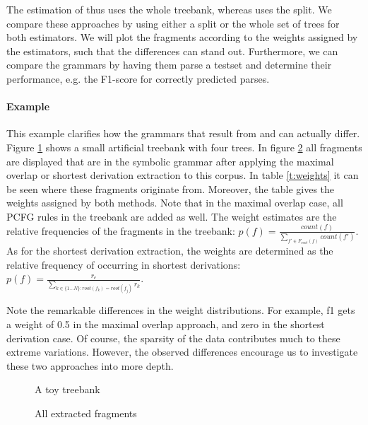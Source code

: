 The estimation of \ddop{} thus uses the whole treebank, whereas \dops{} uses the split. We compare these approaches by using either a split or the whole set of trees for both estimators. We will plot the fragments according to the weights assigned by the estimators, such that the differences can stand out.
Furthermore, we can compare the grammars by having them parse a testset and determine their performance, e.g. the F1-score for correctly predicted parses.


\paragraph{Example}
\FloatBarrier
This example clarifies how the grammars that result from \ddop{} and \dops{} can actually differ. Figure \ref{f:treebank} shows a small artificial treebank with four trees. In figure \ref{f:fragments} all fragments are displayed that are in the symbolic grammar after applying the maximal overlap or shortest derivation extraction to this corpus. In table \ref{t:weights} it can be seen where these fragments originate from. Moreover, the table gives the weights assigned by both methods. Note that in the maximal overlap case, all PCFG rules in the treebank are added as well. The weight estimates are the relative frequencies of the fragments in the treebank: $p(f)=\frac{count(f)}{\sum_{f'\in F_{root}(f)} count(f')}$\cite{sangati2011}. As for the shortest derivation extraction, the weights are determined as the relative frequency of occurring in shortest derivations: $p(f)=\frac{r_c}{\sum_{k\in \{1\ldots N\}:root(f_k)=root(f_j)} r_k}$\cite{zollmann2005}.

Note the remarkable differences in the weight distributions. For example, f1 gets a weight of 0.5 in the maximal overlap approach, and zero in the shortest derivation case. Of course, the sparsity of the data contributes much to these extreme variations. However, the observed differences encourage us to investigate these two approaches into more depth.


\begin{figure}[h!]
\center 
\caption{A toy treebank} \label{f:treebank}
\end{figure}

\begin{figure}[h!]
\center 
\caption{All extracted fragments}
\label{f:fragments}
\end{figure}


